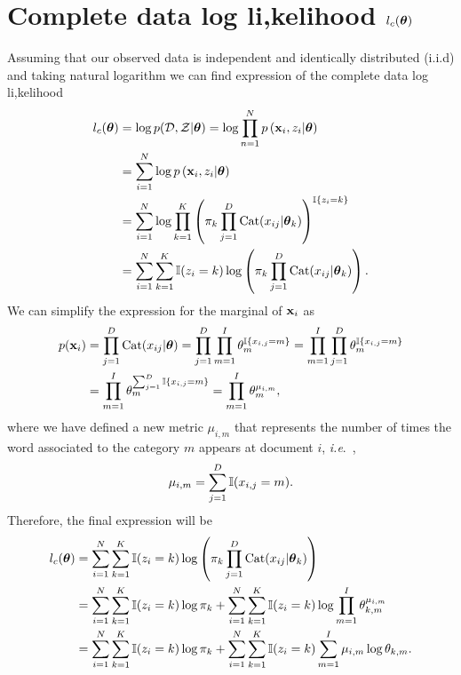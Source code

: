 \documentclass[12pt]{article}
\begin{document}
\section{Complete data log li,kelihood $l_c(\boldsymbol\theta) $}
\noindent Assuming that our observed data is independent and identically distributed (i.i.d) and taking natural logarithm we can find expression of the complete data log li,kelihood
\begin{align}
l_c(\boldsymbol\theta) & = \log p(\mathcal{D},\mathcal{Z}|\boldsymbol\theta) = \log \prod\limits_{n=1}^{N} p\left(\mathbf{x}_{i},z_{i}|\boldsymbol\theta\right)\\
& = \sum_{i=1}^{N}\log p\left(\mathbf{x}_{i},z_{i}|\boldsymbol\theta\right)\\
& = \sum_{i=1}^{N} \log \prod\limits_{k=1}^{K}\left( \pi_{k} \prod \limits_{j=1}^{D} \text{Cat}(x_{ij}|\boldsymbol\theta_{k}) \right)^{\mathbb{I}\lbrace z_{i}=k \rbrace}\\
& = \sum_{i=1}^N\sum_{k=1}^K\mathbb{I} (z_i=k) \log\left( \pi_k\prod_{j=1}^D\operatorname{\mathrm{Cat}}(x_{ij}|\boldsymbol\theta_k)\right).
\end{align}
We can simplify the expression for the marginal of $\mathbf{x}_i$ as
\begin{align}\label{eq:marginal_x}
    p(\mathbf{x}_i) & = \prod_{j=1}^D\operatorname{\mathrm{Cat}}(x_{ij}|\boldsymbol\theta) = \prod_{j=1}^D\prod_{m=1}^I\theta_m^{\mathbb{I} \lbrace x_{i,j}=m \rbrace} = \prod_{m=1}^I\prod_{j=1}^D\theta_m^{\mathbb{I} \lbrace x_{i,j}=m \rbrace } \\
    & = \prod_{m=1}^I\theta_m^{\sum_{j=1}^D {\mathbb{I} \lbrace x_{i,j}=m \rbrace }} = \prod_{m=1}^I \theta_m^{\mu_{i,m}},
\end{align}
where we have defined a new metric $\mu_{i,m}$ that represents the number of times the word associated to the category $m$ appears at document $i$, \textit{i.e}.\ ,
\begin{equation}
    \mu_{i,m} = \sum_{j=1}^D {\mathbb{I}(x_{i,j}=m)}.
\end{equation}
Therefore, the final expression will be 
\begin{align}
    l_c(\boldsymbol\theta) & = \sum_{i=1}^N\sum_{k=1}^K\mathbb{I} (z_i=k) \log\left( \pi_k\prod_{j=1}^D\operatorname{\mathrm{Cat}}(x_{ij}|\boldsymbol\theta_k)\right) \\
    & =  \sum_{i=1}^N\sum_{k=1}^K\mathbb{I} (z_i=k) \log \pi_k + \sum_{i=1}^N\sum_{k=1}^K\mathbb{I} (z_i=k) \log \prod_{m=1}^I \theta_{k,m}^{\mu_{i,m}}\\
    & = \sum_{i=1}^N\sum_{k=1}^K\mathbb{I} (z_i=k) \log \pi_k + \sum_{i=1}^N\sum_{k=1}^K\mathbb{I} (z_i=k) \sum_{m=1}^I \mu_{i,m}\log \theta_{k,m} \label{eq:log_li,ke}.
\end{align}
    
\end{document}
